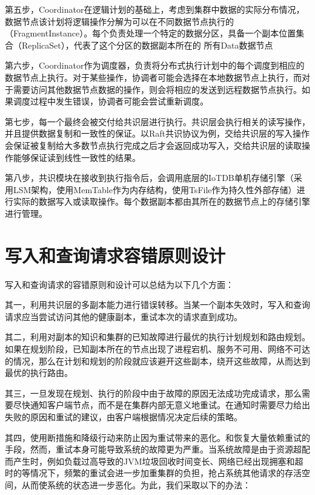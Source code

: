 第五步，Coordinator在逻辑计划的基础上，考虑到集群中数据的实际分布情况，数据节点该计划将逻辑操作分解为可以在不同数据节点执行的\fragmentinstance（FragmentInstance）。每个\fragmentinstance 负责处理一个特定的数据分区，具备一个副本位置集合（ReplicaSet），代表了这个分区的数据副本所在的 所有Data数据节点

第六步，Coordinator作为调度器，负责将分布式执行计划中的每个\fragmentinstance 调度到相应的数据节点上执行。对于某些操作，协调者可能会选择在本地数据节点上执行，而对于需要访问其他数据节点数据的操作，则会将相应的\fragmentinstance 发送到远程数据节点执行。如果调度过程中发生错误，协调者可能会尝试重新调度。

第七步，每一个\fragmentinstance 最终会被交付给共识层进行执行。共识层会执行相关的读写操作，并且提供数据复制和一致性的保证。以Raft共识协议为例，交给共识层的写入操作会保证被复制给大多数节点执行完成之后才会返回成功写入，交给共识层的读取操作能够保证读到线性一致性的结果。

第八步，共识模块在接收到执行指令后，会调用底层的IoTDB单机存储引擎（采用LSM架构，使用MemTable作为内存结构，使用TsFile\cite{zhao2024apachetsfile}作为持久性外部存储）进行实际的数据写入或读取操作。每个数据副本都由其所在的数据节点上的存储引擎进行管理。


\section{写入和查询请求容错原则设计}

写入和查询请求的容错原则和设计可以总结为以下几个方面：

其一，利用共识层的多副本能力进行错误转移。当某一个副本失效时，写入和查询请求应当尝试访问其他的健康副本，重试本次的请求直到成功。

其二，利用对副本的知识和集群的已知故障进行最优的执行计划规划和路由规划。如果在规划阶段，已知副本所在的节点出现了进程宕机、服务不可用、网络不可达的情况，那么在计划和规划的阶段就应该避开这些副本，绕开这些故障，从而达到最优的执行路由。

其三，一旦发现在规划、执行的阶段中由于故障的原因无法成功完成请求，那么需要尽快通知客户端节点，而不是在集群内部无意义地重试。在通知时需要尽力给出失败的原因和重试的建议，由客户端根据情况决定后续的策略。

其四，使用断措施和降级行动来防止因为重试带来的恶化。\failover 和恢复大量依赖重试的手段，然而，重试本身可能导致系统的故障更为严重。当系统故障是由于资源超配而产生时，例如负载过高导致的JVM垃圾回收时间变长、网络已经出现拥塞和超时的等情况下，频繁的重试会进一步加重集群的负担，抢占系统其他请求的存活空间，从而使系统的状态进一步恶化。为此，我们采取以下的办法：

